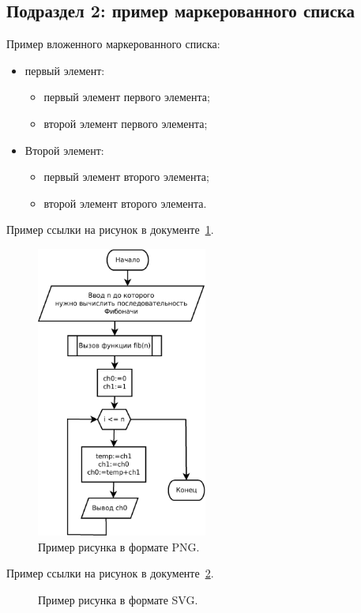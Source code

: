 \subsection{\label{subsec:ch01/sec02/sub02}Подраздел 2: пример маркерованного списка}

Пример вложенного маркерованного списка:
\begin{itemize}
\item первый элемент:
\begin{itemize}
\item первый элемент первого элемента;
\item второй элемент первого элемента;
\end{itemize}
\item Второй элемент:
\begin{itemize}
\item первый элемент второго элемента;
\item второй элемент второго элемента.
\end{itemize}
\end{itemize}

Пример ссылки на рисунок в документе~\ref{fig:example01}.
\begin{figure}[h]
    \centering
    \includegraphics[width=0.5\textwidth]{./images/fibonacci.png}
    \caption{\centering\label{fig:example01}Пример рисунка в формате PNG.}
\end{figure}

Пример ссылки на рисунок в документе~\ref{fig:example02}.
\begin{figure}[h]
    \centering
    
    \caption{\centering\label{fig:example02}Пример рисунка в формате SVG.}
\end{figure}

